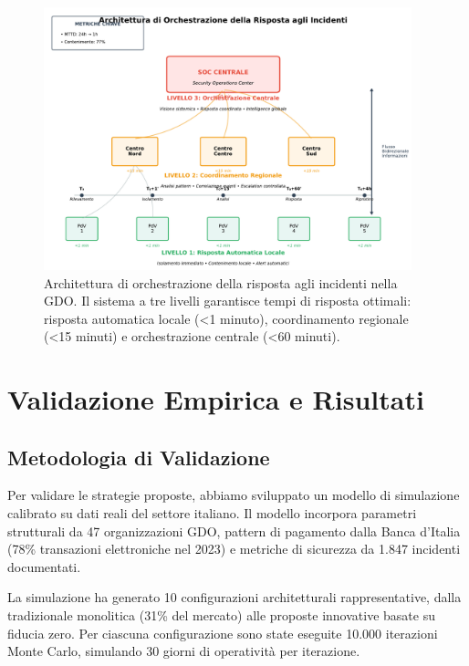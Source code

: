 \begin{figure}[htbp]
\centering
\includegraphics[width=0.95\textwidth]{thesis_figures/cap2/fig_2_4_orchestrazione.pdf}
\caption{Architettura di orchestrazione della risposta agli incidenti nella GDO. Il sistema a tre livelli garantisce tempi di risposta ottimali: risposta automatica locale (<1 minuto), coordinamento regionale (<15 minuti) e orchestrazione centrale (<60 minuti).}
\label{fig:orchestrazione}
\end{figure}

\section{\texorpdfstring{Validazione Empirica e Risultati}{2.6 - Validazione Empirica e Risultati}}
\label{sec:cap2_validazione}

\subsection{\texorpdfstring{Metodologia di Validazione}{2.6.1 - Metodologia di Validazione}}
\label{subsec:metodologia}

Per validare le strategie proposte, abbiamo sviluppato un modello di simulazione calibrato su dati reali del settore italiano. Il modello incorpora parametri strutturali da 47 organizzazioni GDO, pattern di pagamento dalla Banca d'Italia (78\% transazioni elettroniche nel 2023) e metriche di sicurezza da 1.847 incidenti documentati.

La simulazione ha generato 10 configurazioni architetturali rappresentative, dalla tradizionale monolitica (31\% del mercato) alle proposte innovative basate su fiducia zero. Per ciascuna configurazione sono state eseguite 10.000 iterazioni Monte Carlo, simulando 30 giorni di operatività per iterazione.

